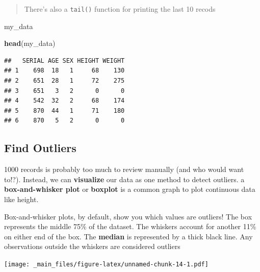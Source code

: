 \documentclass[
]{book}
\newenvironment{Shaded}{\begin{snugshade}}{\end{snugshade}}
\newcommand{\AttributeTok}[1]{\textcolor[rgb]{0.13,0.29,0.53}{#1}}
\newcommand{\FunctionTok}[1]{\textcolor[rgb]{0.13,0.29,0.53}{\textbf{#1}}}
\newcommand{\NormalTok}[1]{#1}
\newcommand{\SpecialCharTok}[1]{\textcolor[rgb]{0.81,0.36,0.00}{\textbf{#1}}}
\newcommand{\StringTok}[1]{\textcolor[rgb]{0.31,0.60,0.02}{#1}}
\begin{document}
\begin{quote}
There's also a \texttt{tail()} function for printing the last 10 recods
\end{quote}

\begin{Shaded}
\begin{Highlighting}[]
\NormalTok{my\_data}
\end{Highlighting}
\end{Shaded}

\begin{Shaded}
\begin{Highlighting}[]
\FunctionTok{head}\NormalTok{(my\_data)}
\end{Highlighting}
\end{Shaded}

\begin{verbatim}
##   SERIAL AGE SEX HEIGHT WEIGHT
## 1    698  18   1     68    130
## 2    651  28   1     72    275
## 3    651   3   2      0      0
## 4    542  32   2     68    174
## 5    870  44   1     71    180
## 6    870   5   2      0      0
\end{verbatim}

\hypertarget{find-outliers}{%
\subsection{Find Outliers}\label{find-outliers}}

1000 records is probably too much to review manually (and who would want to!?). Instead, we can \textbf{visualize} our data as one method to detect outliers. a \textbf{box-and-whisker plot} or \textbf{boxplot} is a common graph to plot continuous data like height.

Box-and-whisker plots, by default, show you which values are outliers! The box represents the middle 75\% of the dataset. The whiskers account for another 11\% on either end of the box. The \textbf{median} is represented by a thick black line. Any observations outside the whiskers are considered outliers

\begin{Shaded}
\end{Shaded}

\texttt{[image: \_main\_files/figure-latex/unnamed-chunk-14-1.pdf]}
\end{document}
